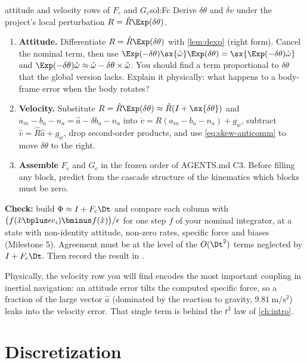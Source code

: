 \begin{derivex}{attitude and velocity rows of $F_c$ and $G_c$}{sol:Fc}
Derive $\dot{\delta\theta}$ and $\dot{\delta v}$ under the project's local perturbation $R = \hat R\Exp(\delta\theta)$.
\begin{enumerate}
  \item \textbf{Attitude.} Differentiate $R = \hat R\Exp(\delta\theta)$ with \cref{lem:dexp} (right form). Cancel the nominal
        term, then use $\Exp(-\delta\theta)\sx{\hat\omega}\Exp(\delta\theta) = \sx{\Exp(-\delta\theta)\hat\omega}$ and
        $\Exp(-\delta\theta)\hat\omega \approx \hat\omega - \delta\theta\times\hat\omega$. You should find a term proportional to $\delta\theta$ that the global
        version lacks. Explain it physically: what happens to a body-frame error when the body rotates?
  \item \textbf{Velocity.} Substitute $R = \hat R\Exp(\delta\theta) \approx \hat R(I + \sx{\delta\theta})$ and
        $a_m - b_a - n_a = \hat a - \delta b_a - n_a$ into $\dot v = R(a_m - b_a - n_a) + g_w$, subtract
        $\dot{\hat v} = \hat R\hat a + g_w$, drop second-order products, and use \eqref{eq:skew-anticomm} to move $\delta\theta$ to the
        right.
  \item \textbf{Assemble} $F_c$ and $G_c$ in the frozen order of AGENTS.md C3. Before filling any block, predict
        from the cascade structure of the kinematics which blocks must be zero.
\end{enumerate}
\textbf{Check:} build $\Phi \approx I + F_c\Dt$ and compare each column with
$\big(f(\hat x\bplus\epsilon e_i)\bminus f(\hat x)\big)/\epsilon$ for one step $f$ of your nominal integrator, at a state with
non-identity attitude, non-zero rates, specific force and biases (Milestone 5). Agreement must be at the level
of the $O(\Dt^2)$ terms neglected by $I + F_c\Dt$. Then record the result in .
\end{derivex}

Physically, the velocity row you will find encodes the most important coupling in inertial navigation: an
attitude error tilts the computed specific force, so a fraction of the large vector $\hat a$ (dominated by the
reaction to gravity, $9.81~\mathrm{m/s^2}$) leaks into the velocity error. That single term is behind the
$t^3$ law of \cref{ch:intro}.

\section{Discretization}

